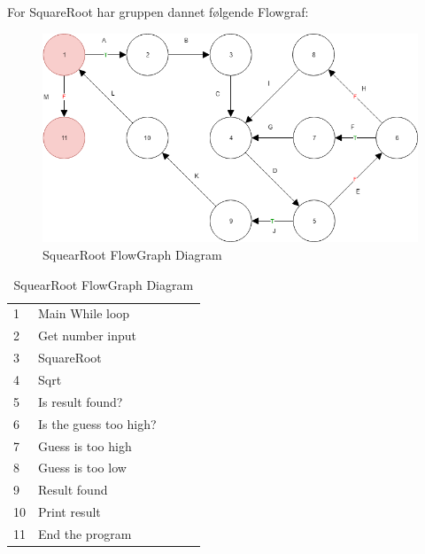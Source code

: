 \documentclass[11pt]{article}
\begin{document}
    \noindent
    For SquareRoot har gruppen dannet følgende Flowgraf:\\
    \begin{table}[H]
        \begin{minipage}{.7\textwidth}
            \begin{figure}[H]
                \centering
                \includegraphics[width=1\textwidth,angle=0]{Struktureret_System_Udvikling/Workshop_3/SquareRoot_FlowGraph.png}
                \caption{SquearRoot FlowGraph Diagram}
                \label{fig:SquearRootGraph}
            \end{figure}
        \end{minipage}
        \begin{minipage}{.3\textwidth}
            \quad
            \begin{tabular}{lllll}
                1 & Main While loop\\
                2 & Get number input\\
                3 & SquareRoot\\
                4 & Sqrt\\
                5 & Is result found?\\
                6 & Is the guess too high?\\
                7 & Guess is too high\\
                8 & Guess is too low\\
                9 & Result found \\
                10 & Print result\\
                11 & End the program\\
            \end{tabular}
        \end{minipage}
    \end{table}
\end{document}
